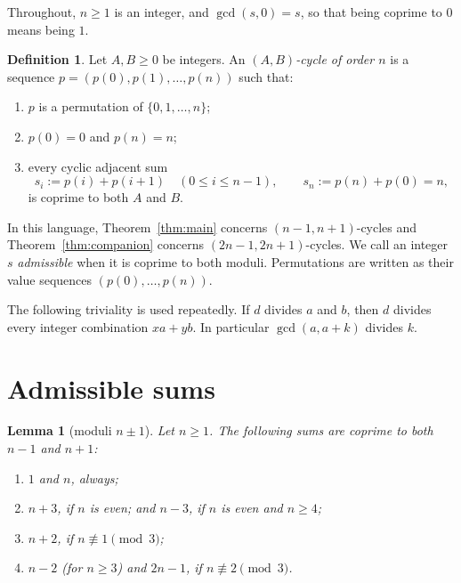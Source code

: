 \documentclass[11pt]{article}
\numberwithin{equation}{section}
\newtheorem{lemma}[theorem]{Lemma}
\theoremstyle{definition}
\newtheorem{definition}[theorem]{Definition}
\theoremstyle{remark}
\begin{document}
Throughout, $n\ge1$ is an integer, and $\gcd(s,0)=s$, so that being coprime to $0$ means being $1$.

\begin{definition}
Let $A,B\ge0$ be integers. An \emph{$(A,B)$-cycle of order $n$} is a sequence
$p=(p(0),p(1),\dots,p(n))$ such that:
\begin{enumerate}
  \item $p$ is a permutation of $\{0,1,\dots,n\}$;
  \item $p(0)=0$ and $p(n)=n$;
  \item every cyclic adjacent sum
  \[
    s_i:=p(i)+p(i+1)\quad(0\le i\le n-1),\qquad s_n:=p(n)+p(0)=n,
  \]
  is coprime to both $A$ and $B$.
\end{enumerate}
\end{definition}

In this language, Theorem~\ref{thm:main} concerns $(n-1,n+1)$-cycles and Theorem~\ref{thm:companion} concerns
$(2n-1,2n+1)$-cycles. We call an integer $s$ \emph{admissible} when it is coprime to both moduli.
Permutations are written as their value sequences $(p(0),\dots,p(n))$.

The following triviality is used repeatedly. If $d$ divides $a$ and $b$, then $d$ divides every
integer combination $xa+yb$. In particular $\gcd(a,a+k)$ divides $k$.

\section{Admissible sums}\label{sec:admissible}

\begin{lemma}[moduli $n\pm1$]\label{lem:adm1}
Let $n\ge1$. The following sums are coprime to both $n-1$ and $n+1$:
\begin{enumerate}
  \item $1$ and $n$, always;
  \item $n+3$, if $n$ is even; and $n-3$, if $n$ is even and $n\ge4$;
  \item $n+2$, if $n\not\equiv1\pmod 3$;
  \item $n-2$ (for $n\ge3$) and $2n-1$, if $n\not\equiv2\pmod 3$.
\end{enumerate}
\end{lemma}
\end{document}
